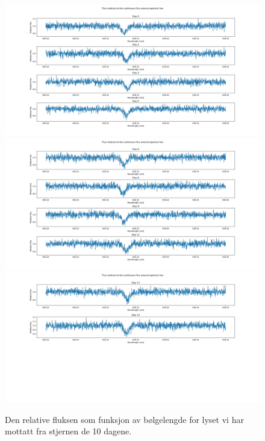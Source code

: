 \documentclass[reprint, english,notitlepage]{revtex4-1}  %
\begin{document}
\begin{figure}
  \includegraphics[width=15cm]{../output/plots/Spectra_1.jpg}
  \includegraphics[width=15cm]{../output/plots/Spectra_2.jpg}
  \includegraphics[width=15cm]{../output/plots/Spectra_3.jpg}
  \caption{Den relative fluksen som funksjon av bølgelengde for lyset vi har mottatt fra stjernen de 10 dagene.}
  \label{fig:spectra}
\end{figure}
\end{document}
